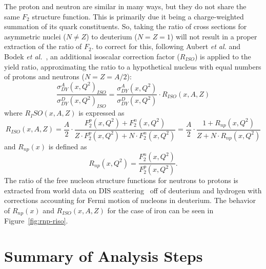 The proton and neutron are similar in many ways, but they do not share the same $F_2$ structure function. This is primarily due it being a charge-weighted summation of its quark constituents. So, taking the ratio of cross sections for asymmetric nuclei ($N\neq Z$) to deuterium ($N=Z=1$) will not result in a proper extraction of the ratio of $F_2$. to correct for this, following Aubert \emph{et al.} and Bodek \emph{et al.}~\cite{Aubert:1983xm, PhysRevLett.50.1431}, an additional isoscalar correction factor ($R_{ISO}$) is applied to the yield ratio, approximating the ratio to a hypothetical nucleus with equal numbers of protons and neutrons ($N=Z=A/2$):
\begin{equation}
\frac{\sigma^A_{DY}(x, Q^2)_{ISO}}{\sigma^D_{DY}(x, Q^2)_{ISO}} = \frac{\sigma^A_{DY}(x, Q^2)}{\sigma^D_{DY}(x, Q^2)} \cdot R_{ISO}(x, A, Z)
\end{equation}
where $R_ISO(x, A, Z)$ is expressed as
\begin{equation}
R_{ISO}(x, A, Z) = \frac{A}{2} \cdot \frac{F_2^p(x, Q^2) + F_2^n(x, Q^2)}{Z\cdot F_2^p(x, Q^2) + N\cdot F_2^n(x,Q^2)} = \frac{A}{2} \cdot \frac{1+R_{np}(x, Q^2)}{Z + N\cdot R_{np}(x, Q^2)}
\end{equation}
and $R_{np}(x)$ is defined as
\begin{equation}
R_{np}(x,Q^2) = \frac{F_2^n(x,Q^2)}{F_2^p(x,Q^2)}.
\end{equation}
The ratio of the free nucleon structure functions for neutrons to protons is extracted from world data on DIS scattering~\cite{Arrington:2008zh}  off of deuterium and hydrogen with corrections accounting for Fermi motion of nucleons in deuterium. The behavior of $R_{np}(x)$ and $R_{ISO}(x, A, Z)$ for the case of iron can be seen in Figure~\ref{fig:rnp-riso}.

\section{Summary of Analysis Steps}

